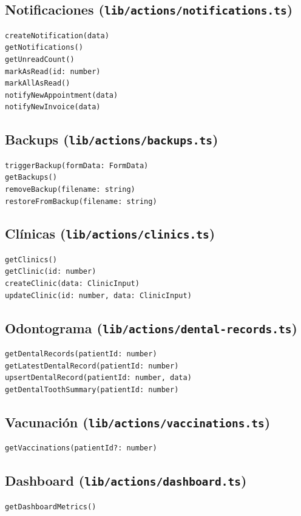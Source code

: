 \subsection{Notificaciones (\texttt{lib/actions/notifications.ts})}

\begin{lstlisting}[style=typescript]
createNotification(data)
getNotifications()
getUnreadCount()
markAsRead(id: number)
markAllAsRead()
notifyNewAppointment(data)
notifyNewInvoice(data)
\end{lstlisting}

\subsection{Backups (\texttt{lib/actions/backups.ts})}

\begin{lstlisting}[style=typescript]
triggerBackup(formData: FormData)
getBackups()
removeBackup(filename: string)
restoreFromBackup(filename: string)
\end{lstlisting}

\subsection{Cl\'inicas (\texttt{lib/actions/clinics.ts})}

\begin{lstlisting}[style=typescript]
getClinics()
getClinic(id: number)
createClinic(data: ClinicInput)
updateClinic(id: number, data: ClinicInput)
\end{lstlisting}

\subsection{Odontograma (\texttt{lib/actions/dental-records.ts})}

\begin{lstlisting}[style=typescript]
getDentalRecords(patientId: number)
getLatestDentalRecord(patientId: number)
upsertDentalRecord(patientId: number, data)
getDentalToothSummary(patientId: number)
\end{lstlisting}

\subsection{Vacunaci\'on (\texttt{lib/actions/vaccinations.ts})}

\begin{lstlisting}[style=typescript]
getVaccinations(patientId?: number)
\end{lstlisting}

\subsection{Dashboard (\texttt{lib/actions/dashboard.ts})}

\begin{lstlisting}[style=typescript]
getDashboardMetrics()
\end{lstlisting}
